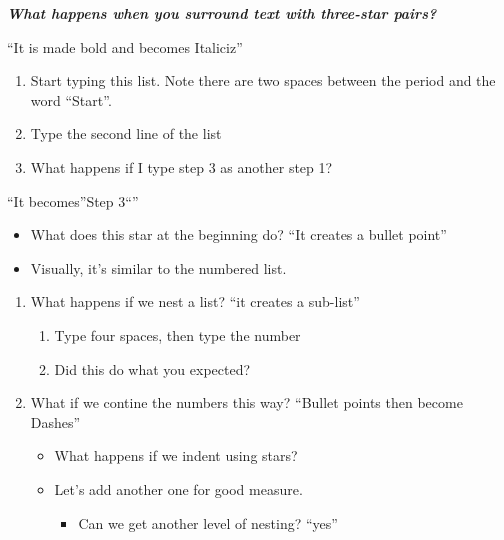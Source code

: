 \documentclass[]{article}
\providecommand{\tightlist}{%
  \setlength{\itemsep}{0pt}\setlength{\parskip}{0pt}}
\begin{document}
\textbf{\emph{What happens when you surround text with three-star
pairs?}}

``It is made bold and becomes Italiciz''

\begin{enumerate}
\def\labelenumi{\arabic{enumi}.}
\tightlist
\item
  Start typing this list. Note there are two spaces between the period
  and the word ``Start''.
\item
  Type the second line of the list
\item
  What happens if I type step 3 as another step 1?
\end{enumerate}

``It becomes''Step 3``''

\begin{itemize}
\tightlist
\item
  What does this star at the beginning do? ``It creates a bullet point''
\item
  Visually, it's similar to the numbered list.
\end{itemize}

\begin{enumerate}
\def\labelenumi{\arabic{enumi}.}
\tightlist
\item
  What happens if we nest a list? ``it creates a sub-list''

  \begin{enumerate}
  \def\labelenumii{\arabic{enumii}.}
  \tightlist
  \item
    Type four spaces, then type the number
  \item
    Did this do what you expected?
  \end{enumerate}
\item
  What if we contine the numbers this way? ``Bullet points then become
  Dashes''

  \begin{itemize}
  \tightlist
  \item
    What happens if we indent using stars?
  \item
    Let's add another one for good measure.

    \begin{itemize}
    \tightlist
    \item
      Can we get another level of nesting? ``yes''
    \end{itemize}
  \end{itemize}
\end{enumerate}
\end{document}
